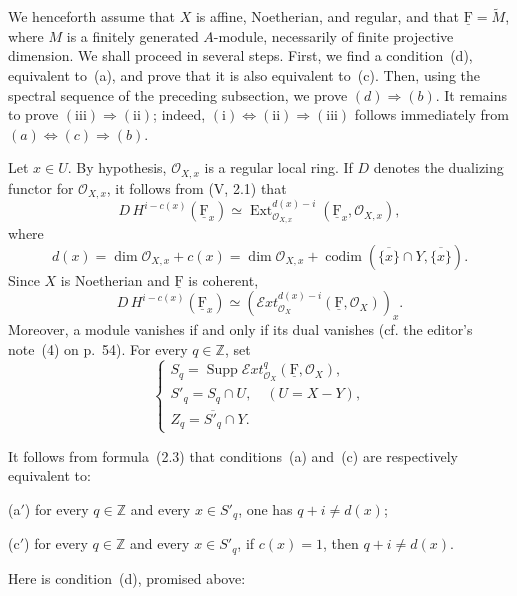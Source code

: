 \documentclass[10pt,a4paper]{article}
\newcommand{\uF}{\underline{\mathrm F}}
\newcommand{\cF}{\uF}
\newcommand{\cO}{\mathcal O}
\newcommand{\sExt}{\mathcal E\!xt}
\newcommand{\Supp}{\operatorname{Supp}}
\newcommand{\codim}{\operatorname{codim}}
\theoremstyle{sgatheorem}
\theoremstyle{plain}
\numberwithin{equation}{section}
\begin{document}
\medskip
We henceforth assume that $X$ is affine, Noetherian, and regular, and that
$\cF=\widetilde M$, where $M$ is a finitely generated $A$-module, necessarily
of finite projective dimension. We shall proceed in several steps. First, we
find a condition~(d), equivalent to~(a), and prove that it is also equivalent
to~(c). Then, using the spectral sequence of the preceding subsection, we
prove $(d)\Rightarrow(b)$. It remains to prove
$(\mathrm{iii})\Rightarrow(\mathrm{ii})$; indeed,
$(\mathrm{i})\Leftrightarrow(\mathrm{ii})\Rightarrow(\mathrm{iii})$ follows
immediately from $(a)\Leftrightarrow(c)\Rightarrow(b)$.

Let $x\in U$. By hypothesis, $\cO_{X,x}$ is a regular local ring. If $D$
denotes the dualizing functor for $\cO_{X,x}$, it follows from (V, 2.1) that
\[
  D\,H^{i-c(x)}(\cF_x)\simeq
  \operatorname{Ext}^{d(x)-i}_{\cO_{X,x}}(\cF_x,\cO_{X,x}),
\]
where
\begin{equation}
  d(x)=\dim\cO_{X,x}+c(x)
      =\dim\cO_{X,x}
       +\codim(\overline{\{x\}}\cap Y,\overline{\{x\}}).
  \tag{2.2}
\end{equation}
Since $X$ is Noetherian and $\cF$ is coherent,
\begin{equation}
  D\,H^{i-c(x)}(\cF_x)\simeq
  (\sExt^{d(x)-i}_{\cO_X}(\cF,\cO_X))_x.
  \tag{2.3}
\end{equation}
Moreover, a module vanishes if and only if its dual vanishes (cf. the
editor's note~(4) on p.~54). For every $q\in\mathbb Z$, set
\begin{equation}
  \begin{cases}
    S_q=\Supp\sExt^q_{\cO_X}(\cF,\cO_X),\\
    S'_q=S_q\cap U,\quad (U=X-Y),\\
    Z_q=\overline{S'_q}\cap Y.
  \end{cases}
  \tag{2.4}
\end{equation}

\medskip
It follows from formula~(2.3) that conditions~(a) and~(c) are respectively
equivalent to:

\medskip
\noindent\textup{(a$'$)} for every $q\in\mathbb Z$ and every $x\in S'_q$,
one has $q+i\ne d(x)$;

\smallskip
\noindent\textup{(c$'$)} for every $q\in\mathbb Z$ and every $x\in S'_q$,
if $c(x)=1$, then $q+i\ne d(x)$.

\medskip
\noindent Here is condition~(d), promised above:
\end{document}
